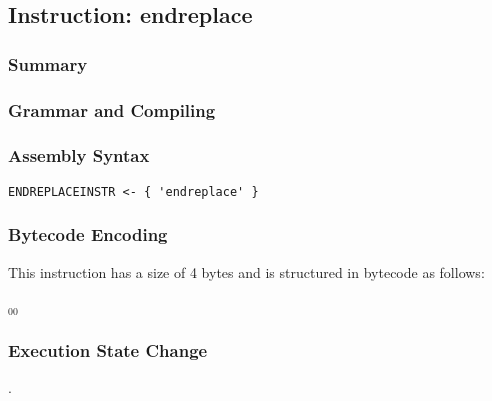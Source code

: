\subsection{Instruction: endreplace}

\subsubsection{Summary}


\subsubsection{Grammar and Compiling}


\subsubsection{Assembly Syntax}

\begin{myquote}
\begin{verbatim}
ENDREPLACEINSTR <- { 'endreplace' }
\end{verbatim}
\end{myquote}


\subsubsection{Bytecode Encoding}

This instruction has a size of 4 bytes and is structured in bytecode as follows:

$_{00}$\ 


\subsubsection{Execution State Change}

.


